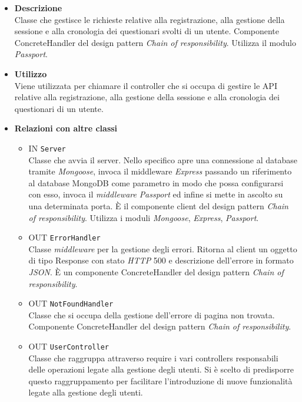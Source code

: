 	\begin{itemize}
		\item \textbf{Descrizione} \\
		Classe che gestisce le richieste relative alla registrazione, alla gestione della sessione e alla cronologia dei questionari svolti di un utente.
Componente ConcreteHandler del design pattern \textit{Chain of responsibility}. Utilizza il modulo \textit{Passport}.
		\item \textbf{Utilizzo} \\
		Viene utilizzata per chiamare il controller che si occupa di gestire le API relative alla registrazione, alla gestione della sessione e alla cronologia dei questionari di un utente.
		\item \textbf{Relazioni con altre classi} 
		\begin{itemize}
		\item 
			IN	\texttt{Server}\\
			Classe che avvia il server. Nello specifico apre una connessione al database tramite \textit{Mongoose}, invoca il middleware \textit{Express} passando un riferimento al database MongoDB come parametro in modo che possa configurarsi con esso, invoca il \textit{middleware} \textit{Passport} ed infine si mette in ascolto su una determinata porta. È il componente client del design pattern \textit{Chain of responsibility}. Utilizza i moduli \textit{Mongoose}, \textit{Express}, \textit{Passport}. 
		\item 
			OUT \texttt{ErrorHandler}\\
			Classe \textit{middleware} per la gestione degli errori. Ritorna al client un oggetto di tipo Response con stato \textit{HTTP} 500 e descrizione dell’errore in formato \textit{JSON}. È un
componente ConcreteHandler del design pattern \textit{Chain of responsibility}.
		\item 
			OUT \texttt{NotFoundHandler}\\
			Classe che si occupa della gestione dell’errore di pagina non trovata. Componente ConcreteHandler del design pattern \textit{Chain of responsibility}.
		\item 
			OUT \texttt{UserController}\\
			Classe che raggruppa attraverso require i vari controllers responsabili delle operazioni legate alla gestione degli utenti. Si è scelto di predisporre questo raggruppamento per facilitare l'introduzione di nuove funzionalità legate alla gestione degli utenti.

\end{itemize}
\end{itemize}
